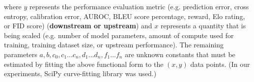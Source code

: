 \documentclass{article} %
\begin{document}
where $y$ represents the performance evaluation metric (e.g. prediction error, cross entropy, calibration error, AUROC, BLEU score percentage, reward, Elo rating, or FID score) (\textbf{downstream or upstream}) and $x$ represents a quantity that is being scaled (e.g. number of model parameters, amount of compute used for training, training dataset size, or upstream performance). The remaining  parameters %
$a, b, c_0, c_1 ... c_n, d_1 ...  d_n, f_1 ... f_n$
are unknown constants that must be estimated by fitting the above functional form to the $(x,y)$ data points. (In our experiments,  SciPy curve-fitting library \citep{virtanen2020scipy} was used.) 

\end{document}
